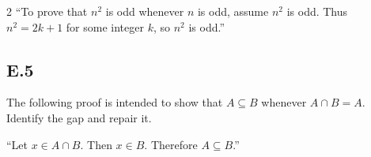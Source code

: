 \documentclass{article}
\begin{document}
\begin{multicols}{2}
``To prove that $n^2$ is odd whenever $n$ is odd, assume $n^2$ is odd. Thus
$n^2=2k+1$ for some integer $k$, so $n^2$ is odd.''

\subsection*{E.5}
The following proof is intended to show that $A\subseteq B$ whenever
$A\cap B=A$. Identify the gap and repair it.

``Let $x\in A\cap B$. Then $x\in B$. Therefore $A\subseteq B$.''

\end{multicols}
\end{document}
